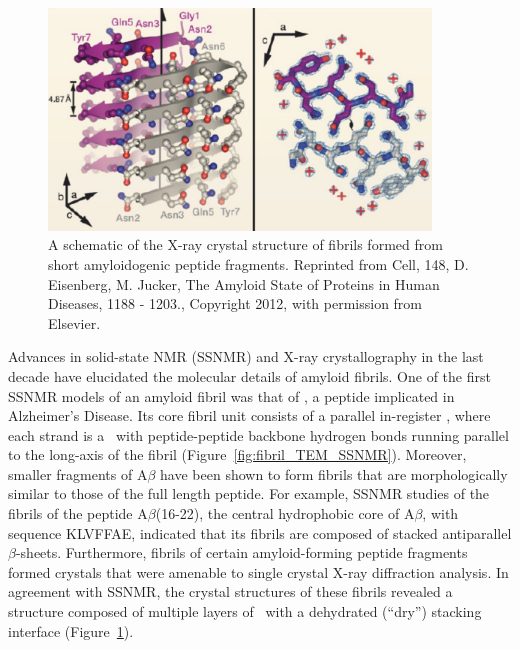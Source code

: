 \begin{figure}
 \centering
 \includegraphics[width=4in]{figures/introduction/fibril_xray_model.pdf}
 \caption[X-ray crystal structure of an amyloid fibril]{A schematic of the X-ray crystal structure of fibrils formed from short amyloidogenic peptide fragments. Reprinted from Cell, 148, D. Eisenberg, M. Jucker, The Amyloid State of Proteins in Human Diseases, 1188 - 1203., Copyright 2012, with permission from Elsevier.}
 \label{fig:fibril_xray_model}
\end{figure}


Advances in solid-state NMR (SSNMR) and X-ray crystallography in the last decade have elucidated the molecular details of amyloid fibrils. One of the first SSNMR models of an amyloid fibril was that of \textbf{}, a peptide implicated in Alzheimer's Disease.\cite{Petkova:2006gx}
Its core fibril unit consists of a parallel in-register \bsheet, where each strand is a \bhairpin\ with peptide-peptide backbone hydrogen bonds running parallel to the long-axis of the fibril (Figure~\ref{fig:fibril_TEM_SSNMR}). Moreover, smaller fragments of A$\beta$ have been shown to form fibrils that are morphologically similar to those of the full length peptide. For example, SSNMR studies of the fibrils of the peptide A$\beta$(16-22), the central hydrophobic core of A$\beta$, with sequence KLVFFAE, indicated that its fibrils are composed of stacked antiparallel $\beta$-sheets.\cite{Balbach:2000vf} Furthermore, fibrils of certain amyloid-forming peptide fragments formed crystals that were amenable to single crystal X-ray diffraction analysis.\cite{Eisenberg:2012hm} In agreement with SSNMR, the crystal structures of these fibrils revealed a structure composed of multiple layers of \bsheet\ with a dehydrated (``dry'') stacking interface (Figure~\ref{fig:fibril_xray_model}).\cite{Sawaya:2007p4363,Eisenberg:2012hm}

